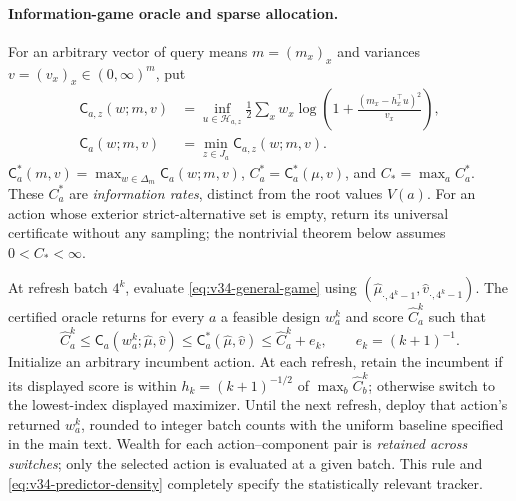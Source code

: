 \documentclass{article}
\theoremstyle{plain}
\theoremstyle{definition}
\begin{document}
\paragraph{Information-game oracle and sparse allocation.}
For an arbitrary vector of query means $m=(m_x)_x$ and variances
$v=(v_x)_x\in(0,\infty)^m$, put
\begin{equation}
\begin{aligned}
\mathsf C_{a,z}(w;m,v)
&=\inf_{u\in\mathcal H_{a,z}}
\frac12\sum_xw_x\log\left(1+\frac{(m_x-h_x^\top u)^2}{v_x}\right),\\
\mathsf C_a(w;m,v)
&=\min_{z\in J_a}\mathsf C_{a,z}(w;m,v).
\end{aligned}
\label{eq:v34-general-game}
\end{equation}
$\mathsf C_a^*(m,v)=\max_{w\in\Delta_m}\mathsf C_a(w;m,v)$,
$C_a^*=\mathsf C_a^*(\mu,v)$, and $C_*=\max_a C_a^*$.
These $C_a^*$ are \emph{information rates}, distinct from the root
values $V(a)$. For an action whose exterior strict-alternative set is
empty, return its universal certificate without any sampling; the
nontrivial theorem below assumes $0<C_*<\infty$.

At refresh batch $4^k$, evaluate \eqref{eq:v34-general-game} using
$(\widehat\mu_{\cdot,4^k-1},\widehat v_{\cdot,4^k-1})$.
The certified oracle returns for every $a$ a feasible design $w_a^k$ and
score $\widehat C_a^k$ such that
\begin{equation}
 \widehat C_a^k\le
 \mathsf C_a(w_a^k;\widehat\mu,\widehat v)
 \le\mathsf C_a^*(\widehat\mu,\widehat v)
 \le\widehat C_a^k+e_k,
 \qquad e_k=(k+1)^{-1}.
 \label{eq:v34-design-contract}
\end{equation}
Initialize an arbitrary incumbent action. At each refresh, retain the
incumbent if its displayed score is within
$h_k=(k+1)^{-1/2}$ of $\max_b\widehat C_b^k$;
otherwise switch to the lowest-index displayed maximizer. Until the next
refresh, deploy that action's returned $w_a^k$, rounded to integer batch
counts with the uniform baseline specified in the main text. Wealth for
each action--component pair is \emph{retained across switches}; only the
selected action is evaluated at a given batch. This rule and
\eqref{eq:v34-predictor-density} completely specify the statistically
relevant tracker.
\end{document}
